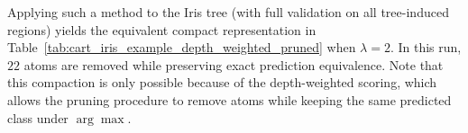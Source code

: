 \documentclass[a4paper,twoside]{article}
\begin{document}



Applying such a method to the Iris tree (with full validation on all tree-induced regions) yields the equivalent compact representation in Table~\ref{tab:cart_iris_example_depth_weighted_pruned} when $\lambda=2$. In this run, $22$ atoms are removed while preserving exact prediction equivalence. Note that this compaction is only possible because of the depth-weighted scoring, which allows the pruning procedure to remove atoms while keeping the same predicted class under $\arg\max$.

\end{document}
